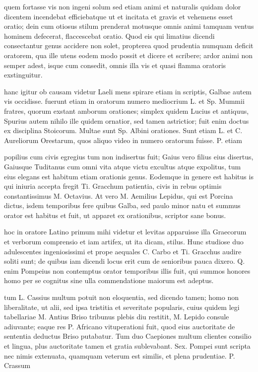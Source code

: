  quem fortasse vis non ingeni solum sed etiam animi et naturalis quidam dolor dicentem incendebat efficiebatque ut et incitata et gravis et vehemens esset oratio; dein cum otiosus stilum prenderat motusque omnis animi tamquam ventus hominem defecerat, flaccescebat oratio. Quod eis qui limatius dicendi consectantur genus accidere non solet, propterea quod prudentia numquam deficit oratorem, qua ille utens eodem modo possit et dicere et scribere; ardor animi non semper adest, isque cum consedit, omnis illa vis et quasi flamma oratoris exstinguitur.

 hanc igitur ob causam videtur Laeli mens spirare etiam in scriptis, Galbae autem vis occidisse. fuerunt etiam in oratorum numero mediocrium L. et Sp. Mummii fratres, quorum exstant amborum orationes; simplex quidem Lucius et antiquus, Spurius autem nihilo ille quidem ornatior, sed tamen astrictior; fuit enim doctus ex disciplina Stoicorum. Multae sunt Sp. Albini orationes. Sunt etiam L. et C. Aureliorum Orestarum, quos aliquo video in numero oratorum fuisse. P. etiam

 popilius cum civis egregius tum non indisertus fuit; Gaius vero filius eius disertus, Gaiusque Tuditanus cum omni vita atque victu excultus atque expolitus, tum eius elegans est habitum etiam orationis genus. Eodemque in genere est habitus is qui iniuria accepta fregit Ti. Gracchum patientia, civis in rebus optimis constantissimus M. Octavius. At vero M. Aemilius Lepidus, qui est Porcina dictus, isdem temporibus fere quibus Galba, sed paulo minor natu et summus orator est habitus et fuit, ut apparet ex orationibus, scriptor sane bonus.

 hoc in oratore Latino primum mihi videtur et levitas apparuisse illa Graecorum et verborum comprensio et iam artifex, ut ita dicam, stilus. Hunc studiose duo adulescentes ingeniosissimi et prope aequales C. Carbo et Ti. Gracchus audire soliti sunt; de quibus iam dicendi locus erit cum de senioribus pauca dixero. Q. enim Pompeius non contemptus orator temporibus illis fuit, qui summos honores homo per se cognitus sine ulla commendatione maiorum est adeptus.

 tum L. Cassius multum potuit non eloquentia, sed dicendo tamen; homo non liberalitate, ut alii, sed ipsa tristitia et severitate popularis, cuius quidem legi tabellariae M. Antius Briso tribunus plebis diu restitit, M. Lepido consule adiuvante; eaque res P. Africano vituperationi fuit, quod eius auctoritate de sententia deductus Briso putabatur. Tum duo Caepiones multum clientes consilio et lingua, plus auctoritate tamen et gratia sublevabant. Sex. Pompei sunt scripta nec nimis extenuata, quamquam veterum est similis, et plena prudentiae. P. Crassum

